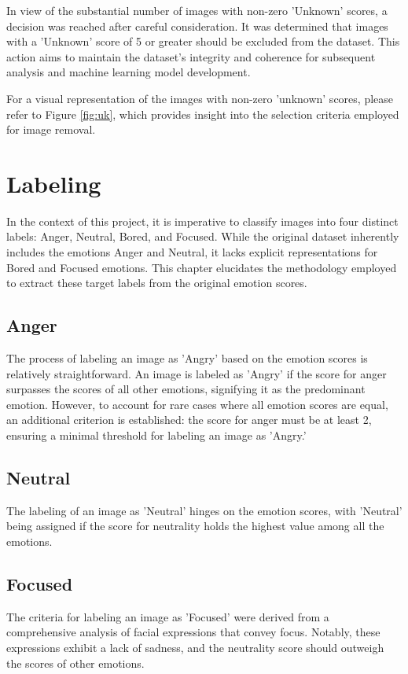 In view of the substantial number of images with non-zero 'Unknown' scores, a decision was reached after careful consideration. It was determined that images with a 'Unknown' score of 5 or greater should be excluded from the dataset. This action aims to maintain the dataset's integrity and coherence for subsequent analysis and machine learning model development.

For a visual representation of the images with non-zero 'unknown' scores, please refer to Figure \ref{fig:uk}, which provides insight into the selection criteria employed for image removal.



\section{Labeling}

In the context of this project, it is imperative to classify images into four distinct labels: Anger, Neutral, Bored, and Focused. While the original dataset inherently includes the emotions Anger and Neutral, it lacks explicit representations for Bored and Focused emotions. This chapter elucidates the methodology employed to extract these target labels from the original emotion scores.

\subsection{Anger}
The process of labeling an image as 'Angry' based on the emotion scores is relatively straightforward. An image is labeled as 'Angry' if the score for anger surpasses the scores of all other emotions, signifying it as the predominant emotion. However, to account for rare cases where all emotion scores are equal, an additional criterion is established: the score for anger must be at least 2, ensuring a minimal threshold for labeling an image as 'Angry.'

\subsection{Neutral}
The labeling of an image as 'Neutral' hinges on the emotion scores, with 'Neutral' being assigned if the score for neutrality holds the highest value among all the emotions.

\subsection{Focused}
The criteria for labeling an image as 'Focused' were derived from a comprehensive analysis of facial expressions that convey focus. Notably, these expressions exhibit a lack of sadness, and the neutrality score should outweigh the scores of other emotions.

